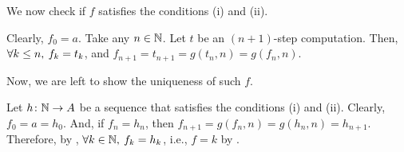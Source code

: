 \documentclass[../introduction_to_set_theory.tex]{subfiles}
\begin{document}
{    \noindent
    We now check if \(f\) satisfies the conditions (i) and (ii).
    \begin{enumerate}[nolistsep, label=(\roman*)]
        \ii 
        Clearly, \(f_0 = a\).
        \ii
        Take any \(n \in \NN\).
        Let \(t\) be an \((n+1)\)-step computation.
        Then, \(\forall k \le n,\: f_k = t_k\),
        and \(f_{n+1} = t_{n+1} = g(t_n, n) = g(f_n, n)\).
    \end{enumerate}
    Now, we are left to show the uniqueness of such \(f\).

    Let \(h \colon \NN \to A\) be a sequence that satisfies the conditions (i) and (ii).
    Clearly, \(f_0 = a = h_0\). And, if \(f_n = h_n\),
    then \(f_{n+1} = g(f_n, n) = g(h_n, n) = h_{n+1}\).
    Therefore, by , \(\fall k \in \NN,\: f_k = h_k\),
    i.e., \(f = k\) by .
}
\end{document}
